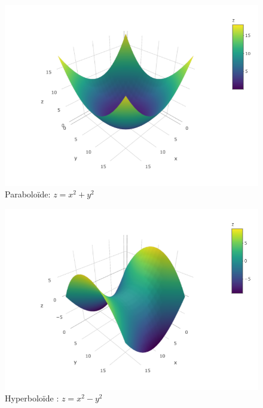 \documentclass[]{book}
\theoremstyle{definition}
\theoremstyle{definition}
\theoremstyle{definition}
\theoremstyle{remark}
\begin{document}
\begin{figure}

{\centering \includegraphics[width=0.8\linewidth]{resources/images/paraboloide} 

}

\caption{Paraboloïde: $z=x^2+y^2$}\label{fig:paraboloide}
\end{figure}

\begin{figure}

{\centering \includegraphics[width=0.8\linewidth]{resources/images/hyperboloide} 

}

\caption{Hyperboloïde : $z=x^2-y^2$}\label{fig:hyperboloide}
\end{figure}
\end{document}

